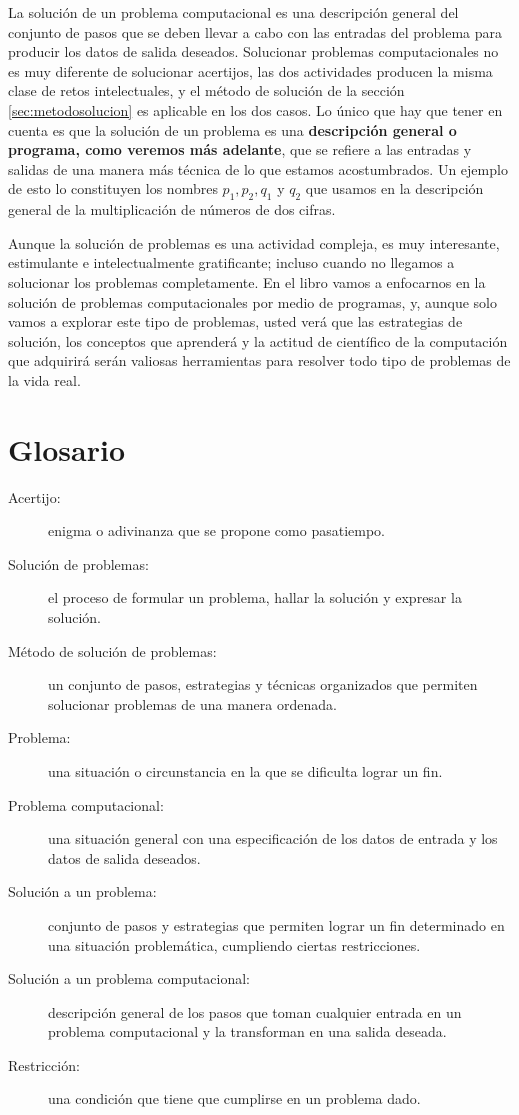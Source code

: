 La solución de un problema computacional es una descripción general
del conjunto de pasos que se deben llevar a cabo con las entradas
del problema para producir los datos de salida deseados. Solucionar
problemas computacionales no es muy diferente de solucionar acertijos,
las dos actividades producen la misma clase de retos intelectuales,
y el método de solución de la sección \ref{sec:metodosolucion} es
aplicable en los dos casos. Lo único que hay que tener en cuenta es
que la solución de un problema es una \textbf{descripción general
o programa, como veremos más adelante}, que se refiere a las entradas
y salidas de una manera más técnica de lo que estamos acostumbrados.
Un ejemplo de esto lo constituyen los nombres $p_{1},p_{2},q_{1}$
y $q_{2}$ que usamos en la descripción general de la multiplicación
de números de dos cifras.

Aunque la solución de problemas es una actividad compleja, es muy
interesante, estimulante e intelectualmente gratificante; incluso
cuando no llegamos a solucionar los problemas completamente. En el
libro vamos a enfocarnos en la solución de problemas computacionales
por medio de programas, y, aunque solo vamos a explorar este tipo
de problemas, usted verá que las estrategias de solución, los conceptos
que aprenderá y la actitud de científico de la computación que adquirirá
serán valiosas herramientas para resolver todo tipo de problemas de
la vida real.

\section{Glosario}
\begin{description}
\item [{Acertijo:}] enigma o adivinanza que se propone como pasatiempo.
\item [{Solución de problemas:}] el proceso de formular un problema,
hallar la solución y expresar la solución.
\item [{Método de solución de problemas:}] un conjunto de pasos, estrategias
y técnicas organizados que permiten solucionar problemas de una manera
ordenada.
\item [{Problema:}] una situación o circunstancia en la que se dificulta
lograr un fin.
\item [{Problema computacional:}] una situación general con una especificación
de los datos de entrada y los datos de salida deseados.
\item [{Solución a un problema:}] conjunto de pasos y estrategias que
permiten lograr un fin determinado en una situación problemática,
cumpliendo ciertas restricciones.
\item [{Solución a un problema computacional:}] descripción general de
los pasos que toman cualquier entrada en un problema computacional
y la transforman en una salida deseada.
\item [{Restricción:}] una condición que tiene que cumplirse en un problema
dado.

  
  
  
\end{description}

